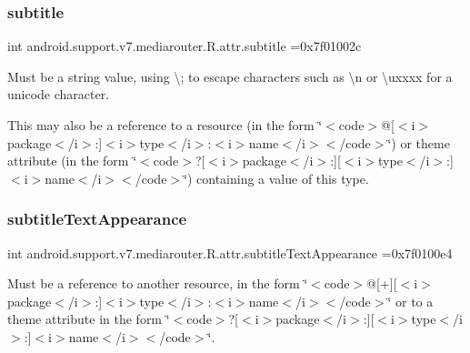 \subsubsection{\texorpdfstring{subtitle}{subtitle}}
{\footnotesize\ttfamily int android.\+support.\+v7.\+mediarouter.\+R.\+attr.\+subtitle =0x7f01002c\hspace{0.3cm}{\ttfamily [static]}}

Must be a string value, using \textquotesingle{}\textbackslash{};\textquotesingle{} to escape characters such as \textquotesingle{}\textbackslash{}n\textquotesingle{} or \textquotesingle{}\textbackslash{}uxxxx\textquotesingle{} for a unicode character. 

This may also be a reference to a resource (in the form \char`\"{}$<$code$>$@\mbox{[}$<$i$>$package$<$/i$>$\+:\mbox{]}$<$i$>$type$<$/i$>$\+:$<$i$>$name$<$/i$>$$<$/code$>$\char`\"{}) or theme attribute (in the form \char`\"{}$<$code$>$?\mbox{[}$<$i$>$package$<$/i$>$\+:\mbox{]}\mbox{[}$<$i$>$type$<$/i$>$\+:\mbox{]}$<$i$>$name$<$/i$>$$<$/code$>$\char`\"{}) containing a value of this type. \mbox{\label{classandroid_1_1support_1_1v7_1_1mediarouter_1_1R_1_1attr_a04ae58aea15169a54ecf53faabb46f36}} 
\subsubsection{\texorpdfstring{subtitle\+Text\+Appearance}{subtitleTextAppearance}}
{\footnotesize\ttfamily int android.\+support.\+v7.\+mediarouter.\+R.\+attr.\+subtitle\+Text\+Appearance =0x7f0100e4\hspace{0.3cm}{\ttfamily [static]}}

Must be a reference to another resource, in the form \char`\"{}$<$code$>$@\mbox{[}+\mbox{]}\mbox{[}$<$i$>$package$<$/i$>$\+:\mbox{]}$<$i$>$type$<$/i$>$\+:$<$i$>$name$<$/i$>$$<$/code$>$\char`\"{} or to a theme attribute in the form \char`\"{}$<$code$>$?\mbox{[}$<$i$>$package$<$/i$>$\+:\mbox{]}\mbox{[}$<$i$>$type$<$/i$>$\+:\mbox{]}$<$i$>$name$<$/i$>$$<$/code$>$\char`\"{}. \mbox{\label{classandroid_1_1support_1_1v7_1_1mediarouter_1_1R_1_1attr_ac92a9bbf6e485bae5fbbbbea6f8a2dd9}} 
